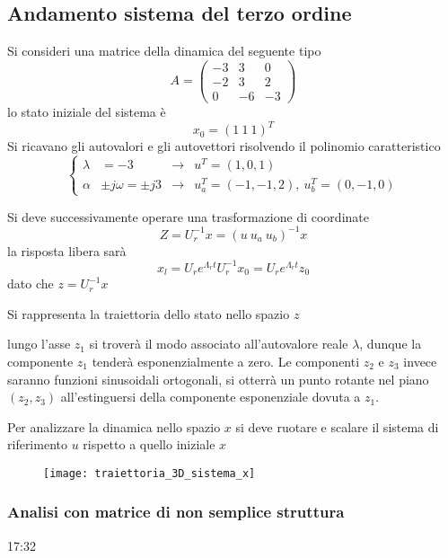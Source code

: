 
\subsection{Andamento sistema del terzo ordine}
Si consideri una matrice della dinamica del seguente tipo
$$
A = \begin{pmatrix}
-3 & 3 & 0\\
-2 & 3 & 2\\
0  & -6 & -3
\end{pmatrix}
$$
lo stato iniziale del sistema è
$$
x_0 = (1 \ 1\ 1)^T
$$
Si ricavano gli autovalori e gli autovettori risolvendo il polinomio
caratteristico
$$
\left\{\begin{aligned}
\lambda &= -3 &\rightarrow& u^T=(1, 0, 1)\\
\alpha &\pm j\omega = \pm j3 &\rightarrow& u_a^T=(-1, -1 , 2),\ u_b^T = (0, -1 ,
0)
\end{aligned}\right.
$$

Si deve successivamente operare una trasformazione di coordinate
$$
Z = U_r^{-1}x = (u\ u_a \ u_b)^{-1}x
$$
la risposta libera sarà
$$
x_l = U_re^{\Lambda_r t}U_r^{-1} x_0 = U_r e^{\Lambda_r t} z_0
$$
dato che $z = U_r^{-1} x$

Si rappresenta la traiettoria dello stato nello spazio $z$

\begin{figure}[H]
 \centering
\end{figure}

lungo l'asse $z_1$ si troverà il modo associato all'autovalore reale $\lambda$,
dunque la componente $z_1$ tenderà esponenzialmente a zero.
Le componenti $z_2$ e $z_3$ invece saranno funzioni sinusoidali ortogonali, si
otterrà un punto rotante nel piano $(z_2,z_3)$ all'estinguersi della componente
esponenziale dovuta a $z_1$.

\newpage
Per analizzare la dinamica nello spazio $x$ si deve ruotare e scalare il
sistema di riferimento $u$ rispetto a quello iniziale $x$
\begin{figure}[H]
 \centering
 \texttt{[image: traiettoria\_3D\_sistema\_x]}
\end{figure}

\subsubsection{Analisi con matrice di non semplice struttura}
17:32
